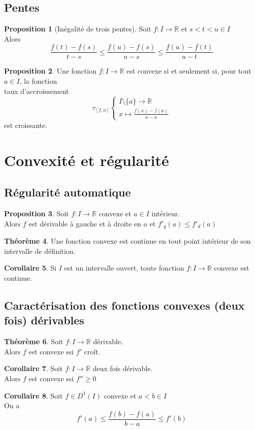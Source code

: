 \documentclass[10pt,a4paper]{article}
\theoremstyle{definition}
\newtheorem{proposition}{Proposition}[section]
\newtheorem{theorem}[proposition]{Théorème}
\newtheorem{corollaire}[proposition]{Corollaire}
\begin{document}
\subsection{Pentes}
\begin{proposition}[Inégalité de trois pentes]
Soit $f: I \to \mathbb{R}$ et $s < t < u \in I$ \\
Alors
\[\frac{f(t) - f(s)}{t - s} \leq \frac{f(u) - f(s)}{u - s} \leq \frac{f(u) - f(t)}{u - t}\]
\end{proposition}
\begin{proposition}
Une fonction $f: I \to \mathbb{R}$ est convexe si et seulement si, pour tout $a \in I$, la fonction \\
taux d'accroissement
\[ \tau_{[f, a]} \begin{cases}
I \setminus \{ a \} \to \mathbb{R} \\
x \mapsto \frac{f(x) - f(a)}{x - a}
\end{cases} \]
est croissante.
\end{proposition}

\section{Convexité et régularité}
\subsection{Régularité automatique}
\begin{proposition}
Soit $f: I \to \mathbb{R}$ convexe et $a \in I$ intérieur. \\
Alors $f$ est dérivable à gauche et à droite en $a$ et $f'_g(a) \leq f'_d(a)$
\end{proposition}
\begin{theorem}
Une fonction convexe est continue en tout point intérieur de son intervalle de définition.
\end{theorem}
\begin{corollaire}
Si $I$ est un intervalle ouvert, toute fonction $f: I \to \mathbb{R}$ convexe est continue.
\end{corollaire}

\subsection{Caractérisation des fonctions convexes (deux fois) dérivables}
\begin{theorem}
Soit $f: I \to \mathbb{R}$ dérivable. \\
Alors $f$ est convexe ssi $f'$ croît.
\end{theorem}
\begin{corollaire}
Soit $f: I \to \mathbb{R}$ deux fois dérivable. \\
Alors $f$ est convexe ssi $f'' \geq 0$
\end{corollaire}
\begin{corollaire}
Soit $f \in D^1(I)$ convexe et $a < b \in I$ \\
On a
\[ f'(a) \leq \frac{f(b) - f(a)}{b - a} \leq f'(b) \]
\end{corollaire}
\end{document}
